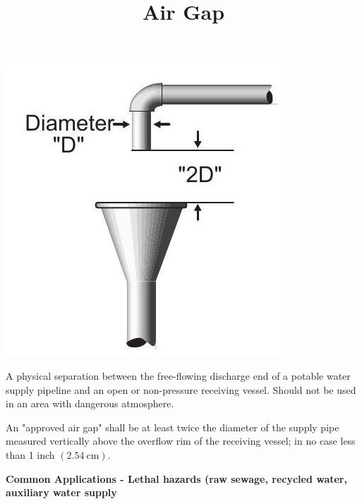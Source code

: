 \documentclass[10pt]{article}
\title{Air Gap }
\author{}
\date{}
\begin{document}
\maketitle
\includegraphics[max width=\textwidth]{Airgap}

A physical separation between the free-flowing discharge end of a potable water supply pipeline and an open or non-pressure receiving vessel. Should not be used in an area with dangerous atmosphere.

An "approved air gap" shall be at least twice the diameter of the supply pipe measured vertically above the overflow rim of the receiving vessel; in no case less than 1 inch $(2.54 \mathrm{~cm})$.

\textbf{Common Applications - Lethal hazards (raw sewage, recycled water, auxiliary water supply}
\end{document}
